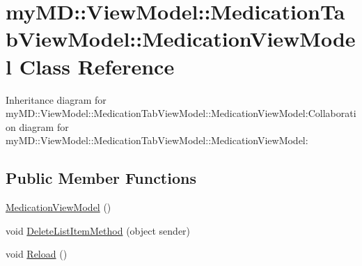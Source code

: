 \hypertarget{classmy_m_d_1_1_view_model_1_1_medication_tab_view_model_1_1_medication_view_model}{
\section{my\-MD::View\-Model::Medication\-Tab\-View\-Model::Medication\-View\-Model Class Reference}
\label{dc/d91/classmy_m_d_1_1_view_model_1_1_medication_tab_view_model_1_1_medication_view_model}
}
Inheritance diagram for my\-MD::View\-Model::Medication\-Tab\-View\-Model::Medication\-View\-Model:Collaboration diagram for my\-MD::View\-Model::Medication\-Tab\-View\-Model::Medication\-View\-Model:\subsection*{Public Member Functions}
\begin{CompactItemize}
\item 
\hypertarget{classmy_m_d_1_1_view_model_1_1_medication_tab_view_model_1_1_medication_view_model_304977a2398453b48a5a929e67e977f8}{
\hyperlink{classmy_m_d_1_1_view_model_1_1_medication_tab_view_model_1_1_medication_view_model_304977a2398453b48a5a929e67e977f8}{Medication\-View\-Model} ()}
\label{dc/d91/classmy_m_d_1_1_view_model_1_1_medication_tab_view_model_1_1_medication_view_model_304977a2398453b48a5a929e67e977f8}

\item 
\hypertarget{classmy_m_d_1_1_view_model_1_1_medication_tab_view_model_1_1_medication_view_model_9dd9da88a0e4c95fbcfedb3be7389655}{
void \hyperlink{classmy_m_d_1_1_view_model_1_1_medication_tab_view_model_1_1_medication_view_model_9dd9da88a0e4c95fbcfedb3be7389655}{Delete\-List\-Item\-Method} (object sender)}
\label{dc/d91/classmy_m_d_1_1_view_model_1_1_medication_tab_view_model_1_1_medication_view_model_9dd9da88a0e4c95fbcfedb3be7389655}

\item 
\hypertarget{classmy_m_d_1_1_view_model_1_1_medication_tab_view_model_1_1_medication_view_model_cc93c0d32a42280187311972b0ff99ed}{
void \hyperlink{classmy_m_d_1_1_view_model_1_1_medication_tab_view_model_1_1_medication_view_model_cc93c0d32a42280187311972b0ff99ed}{Reload} ()}
\label{dc/d91/classmy_m_d_1_1_view_model_1_1_medication_tab_view_model_1_1_medication_view_model_cc93c0d32a42280187311972b0ff99ed}

\end{CompactItemize}
